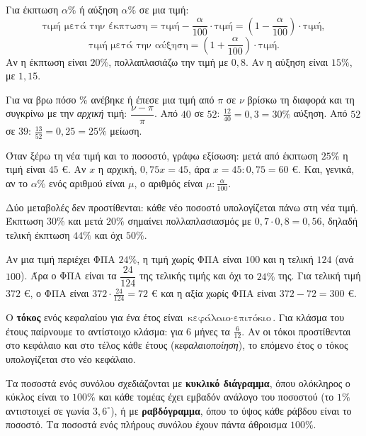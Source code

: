 

Για έκπτωση $\alpha\%$ ή αύξηση $\alpha\%$ σε μια τιμή:
$$\text{τιμή μετά την έκπτωση}=\text{τιμή}-\dfrac{\alpha}{100}\cdot\text{τιμή}=\left(1-\dfrac{\alpha}{100}\right)\cdot\text{τιμή},$$
$$\text{τιμή μετά την αύξηση}=\left(1+\dfrac{\alpha}{100}\right)\cdot\text{τιμή}.$$
Αν η έκπτωση είναι $20\%$, πολλαπλασιάζω την τιμή με $0{,}8$. Αν η αύξηση είναι $15\%$, με $1{,}15$.


Για να βρω πόσο \% ανέβηκε ή έπεσε μια τιμή από $\pi$ σε $\nu$ βρίσκω τη διαφορά και τη συγκρίνω με την \emph{αρχική} τιμή: $\dfrac{\nu-\pi}{\pi}$. Από $40$ σε $52$: $\frac{12}{40}=0{,}3=30\%$ αύξηση. Από $52$ σε $39$: $\frac{13}{52}=0{,}25=25\%$ μείωση.


Όταν ξέρω τη νέα τιμή και το ποσοστό, γράφω εξίσωση: μετά από έκπτωση $25\%$ η τιμή είναι $45$ €. Αν $x$ η αρχική, $0{,}75x=45$, άρα $x=45:0{,}75=60$ €. Και, γενικά, αν το $\alpha\%$ ενός αριθμού είναι $\mu$, ο αριθμός είναι $\mu:\frac{\alpha}{100}$.


Δύο μεταβολές δεν προστίθενται: κάθε νέο ποσοστό υπολογίζεται πάνω στη νέα τιμή. Έκπτωση $30\%$ και μετά $20\%$ σημαίνει πολλαπλασιασμός με $0{,}7\cdot0{,}8=0{,}56$, δηλαδή τελική έκπτωση $44\%$ και όχι $50\%$.


Αν μια τιμή περιέχει ΦΠΑ $24\%$, η τιμή χωρίς ΦΠΑ είναι $100$ και η τελική $124$ (ανά $100$). Άρα ο ΦΠΑ είναι τα $\dfrac{24}{124}$ της τελικής τιμής και όχι το $24\%$ της. Για τελική τιμή $372$ €, ο ΦΠΑ είναι $372\cdot\frac{24}{124}=72$ € και η αξία χωρίς ΦΠΑ είναι $372-72=300$ €.


Ο \textbf{τόκος} ενός κεφαλαίου για ένα έτος είναι $\text{κεφάλαιο}\cdot\text{επιτόκιο}$. Για κλάσμα του έτους παίρνουμε το αντίστοιχο κλάσμα: για $6$ μήνες τα $\frac{6}{12}$. Αν οι τόκοι προστίθενται στο κεφάλαιο και στο τέλος κάθε έτους (\emph{κεφαλαιοποίηση}), το επόμενο έτος ο τόκος υπολογίζεται στο νέο κεφάλαιο.


Τα ποσοστά ενός συνόλου σχεδιάζονται με \textbf{κυκλικό διάγραμμα}, όπου ολόκληρος ο κύκλος είναι το $100\%$ και κάθε τομέας έχει εμβαδόν ανάλογο του ποσοστού (το $1\%$ αντιστοιχεί σε γωνία $3{,}6^\circ$), ή με \textbf{ραβδόγραμμα}, όπου το ύψος κάθε ράβδου είναι το ποσοστό. Τα ποσοστά ενός πλήρους συνόλου έχουν πάντα άθροισμα $100\%$.

